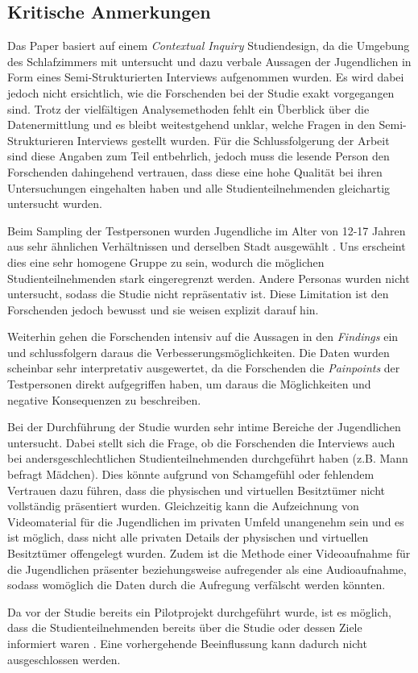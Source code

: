 \documentclass{hsflensburg}
\begin{document}
	\subsection{Kritische Anmerkungen}

	Das Paper basiert auf einem \textit{Contextual Inquiry} Studiendesign, da die Umgebung des Schlafzimmers mit untersucht und dazu verbale Aussagen der Jugendlichen in Form eines Semi-Strukturierten Interviews aufgenommen wurden. Es wird dabei jedoch nicht ersichtlich, wie die Forschenden bei der Studie exakt vorgegangen sind. Trotz der vielfältigen Analysemethoden fehlt ein Überblick über die Datenermittlung und es bleibt weitestgehend unklar, welche Fragen in den Semi-Strukturieren Interviews gestellt wurden. Für die Schlussfolgerung der Arbeit sind diese Angaben zum Teil entbehrlich, jedoch muss die lesende Person den Forschenden dahingehend vertrauen, dass diese eine hohe Qualität bei ihren Untersuchungen eingehalten haben und alle Studienteilnehmenden gleichartig untersucht wurden.
	
	Beim Sampling der Testpersonen wurden Jugendliche im Alter von 12-17 Jahren aus sehr ähnlichen Verhältnissen und derselben Stadt ausgewählt  \cite{odom2011teenagers}. Uns erscheint dies eine sehr homogene Gruppe zu sein, wodurch die möglichen Studienteilnehmenden stark eingeregrenzt werden. Andere Personas wurden nicht untersucht, sodass die Studie nicht repräsentativ ist. Diese Limitation ist den Forschenden jedoch bewusst und sie weisen explizit darauf hin. 

	Weiterhin gehen die Forschenden intensiv auf die Aussagen in den \textit{Findings} ein und schlussfolgern daraus die Verbesserungsmöglichkeiten. Die Daten wurden scheinbar sehr interpretativ ausgewertet, da die Forschenden die \textit{Painpoints} der Testpersonen direkt aufgegriffen haben, um daraus die Möglichkeiten und negative Konsequenzen zu beschreiben.

	Bei der Durchführung der Studie wurden sehr intime Bereiche der Jugendlichen untersucht. Dabei stellt sich die Frage, ob die Forschenden die Interviews auch bei andersgeschlechtlichen Studienteilnehmenden durchgeführt haben (z.B. Mann befragt Mädchen). Dies könnte aufgrund von Schamgefühl oder fehlendem Vertrauen dazu führen, dass die physischen und virtuellen Besitztümer nicht vollständig präsentiert wurden. Gleichzeitig kann die Aufzeichnung von Videomaterial für die Jugendlichen im privaten Umfeld unangenehm sein und es ist möglich, dass nicht alle privaten Details der physischen und virtuellen Besitztümer offengelegt wurden. Zudem ist die Methode einer Videoaufnahme für die Jugendlichen präsenter beziehungsweise aufregender als eine Audioaufnahme, sodass womöglich die Daten durch die Aufregung verfälscht werden könnten. 

	Da vor der Studie bereits ein Pilotprojekt durchgeführt wurde, ist es möglich, dass die Studienteilnehmenden bereits über die Studie oder dessen Ziele informiert waren  \cite{odom2011teenagers}. Eine vorhergehende Beeinflussung kann dadurch nicht ausgeschlossen werden. 


	\clearpage
	\nocite{*}	
	
	
\end{document}
